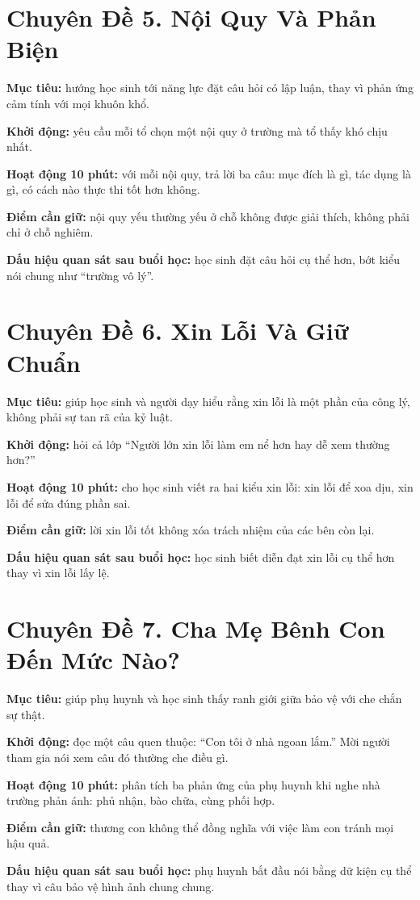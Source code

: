 \section*{Chuyên Đề 5. Nội Quy Và Phản Biện}

\begin{goigiaovien}
\textbf{Mục tiêu:} hướng học sinh tới năng lực đặt câu hỏi có lập luận, thay vì phản ứng cảm tính với mọi khuôn khổ.

\textbf{Khởi động:} yêu cầu mỗi tổ chọn một nội quy ở trường mà tổ thấy khó chịu nhất.

\textbf{Hoạt động 10 phút:} với mỗi nội quy, trả lời ba câu: mục đích là gì, tác dụng là gì, có cách nào thực thi tốt hơn không.

\textbf{Điểm cần giữ:} nội quy yếu thường yếu ở chỗ không được giải thích, không phải chỉ ở chỗ nghiêm.

\textbf{Dấu hiệu quan sát sau buổi học:} học sinh đặt câu hỏi cụ thể hơn, bớt kiểu nói chung như ``trường vô lý''.
\end{goigiaovien}

\section*{Chuyên Đề 6. Xin Lỗi Và Giữ Chuẩn}

\begin{goigiaovien}
\textbf{Mục tiêu:} giúp học sinh và người dạy hiểu rằng xin lỗi là một phần của công lý, không phải sự tan rã của kỷ luật.

\textbf{Khởi động:} hỏi cả lớp ``Người lớn xin lỗi làm em nể hơn hay dễ xem thường hơn?''

\textbf{Hoạt động 10 phút:} cho học sinh viết ra hai kiểu xin lỗi: xin lỗi để xoa dịu, xin lỗi để sửa đúng phần sai.

\textbf{Điểm cần giữ:} lời xin lỗi tốt không xóa trách nhiệm của các bên còn lại.

\textbf{Dấu hiệu quan sát sau buổi học:} học sinh biết diễn đạt xin lỗi cụ thể hơn thay vì xin lỗi lấy lệ.
\end{goigiaovien}

\section*{Chuyên Đề 7. Cha Mẹ Bênh Con Đến Mức Nào?}

\begin{goigiaovien}
\textbf{Mục tiêu:} giúp phụ huynh và học sinh thấy ranh giới giữa bảo vệ với che chắn sự thật.

\textbf{Khởi động:} đọc một câu quen thuộc: ``Con tôi ở nhà ngoan lắm.'' Mời người tham gia nói xem câu đó thường che điều gì.

\textbf{Hoạt động 10 phút:} phân tích ba phản ứng của phụ huynh khi nghe nhà trường phản ánh: phủ nhận, bào chữa, cùng phối hợp.

\textbf{Điểm cần giữ:} thương con không thể đồng nghĩa với việc làm con tránh mọi hậu quả.

\textbf{Dấu hiệu quan sát sau buổi học:} phụ huynh bắt đầu nói bằng dữ kiện cụ thể thay vì câu bảo vệ hình ảnh chung chung.
\end{goigiaovien}

